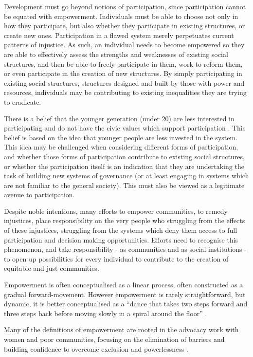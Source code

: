 Development must go beyond notions of participation, since participation cannot be equated with empowerment. Individuals must be able to choose not only in how they participate, but also whether they participate in existing structures, or create new ones. Participation in a flawed system merely perpetuates current patterns of injustice. As such, an individual needs to become empowered so they are able to effectively assess the strengths and weaknesses of existing social structures, and then be able to freely participate in them, work to reform them, or even participate in the creation of new structures. By simply participating in existing social structures, structures designed and built by those with power and resources, individuals may be contributing to existing inequalities they are trying to eradicate.

There is a belief that the younger generation (under 20) are less interested in participating and do not have the civic values which support participation \citep[][p17]{Pattie2004}. This belief is based on the idea that younger people are less invested in the system. This idea may be challenged when considering different forms of participation, and whether those forms of participation contribute to existing social structures, or whether the participation itself is an indication that they are undertaking the task of building new systems of governance (or at least engaging in systems which are not familiar to the general society). This must also be viewed as a legitimate avenue to participation.

Despite noble intentions, many efforts to empower communities, to remedy injustices, place responsibility on the very people who struggling from the effects of these injustices, struggling from the systems which deny them access to full participation and decision making opportunities. Efforts need to recognise this phenomenon, and take responsibility - as communities and as social institutions - to open up possibilities for every individual to contribute to the creation of equitable and just communities.


Empowerment is often conceptualised as a linear process, often constructed as a gradual forward-movement. However empowerment is rarely straightforward, but dynamic, it is better conceptualised as a “dance that takes two steps forward and three steps back before moving slowly in a spiral around the floor”  \citep[][p54]{VeneKlasen2002}.

Many of the definitions of empowerment are rooted in the advocacy work with women and poor communities, focusing on the elimination of barriers and building confidence to overcome exclusion and powerlessness \citep{VeneKlasen2002}.

